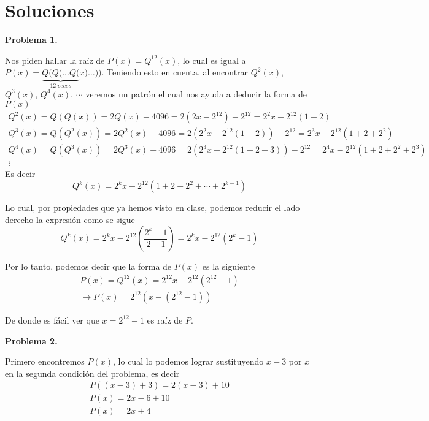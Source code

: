 \newpage
\section*{\large Soluciones}

    \textbf{Problema 1.}

Nos piden hallar la raíz de $P(x) = Q^{12}(x)$, lo cual es igual a $P(x) = \underbrace{Q(Q(...Q(}_{12\ veces}x)\dots))$.
Teniendo esto en cuenta, al encontrar $Q^{2}(x)$, $Q^{3}(x)$, $Q^{4}(x)$, $\cdots$ veremos un patrón el cual nos ayuda a deducir la forma de $P(x)$
\begin{gather*}
    Q^{2}(x) = Q(Q(x)) = 2 Q(x) - 4096 = 2(2x - 2^{12}) - 2^{12} = \boxed{2^2 x - 2^{12} (1 + 2)} \\
    Q^{3}(x) = Q(Q^2(x)) = 2 Q^2(x) - 4096 = 2(2^2 x - 2^{12} (1 + 2)) - 2^{12} = \boxed{2^3 x - 2^{12} (1 + 2 + 2^2)}\\
    Q^{4}(x) = Q(Q^3(x)) = 2 Q^3(x) - 4096 = 2\left(2^3 x - 2^{12} (1 + 2 + 3)\right) - 2^{12} = \boxed{2^4 x - 2^{12} (1 + 2 + 2^2 + 2^3)}\\
    \vdots
\end{gather*}
Es decir
\[\boxed{Q^{k}(x) = 2^k x - 2^{12} (1 + 2 + 2^2 + \cdots + 2^{k-1})}\]

Lo cual, por propiedades que ya hemos visto en clase, podemos reducir el lado derecho la expresión como se sigue
\[Q^{k}(x) = 2^k x - 2^{12} \left(\frac{2^k - 1}{2 - 1}\right) = \boxed{2^k x - 2^{12}(2^k - 1)}\]

Por lo tanto, podemos decir que la forma de $P(x)$ es la siguiente
\begin{gather*}
    P(x) = Q^{12}(x) = 2^{12} x - 2^{12}\left(2^{12} - 1\right)\\
    \longrightarrow P(x) = 2^{12} \left(x - (2^{12} - 1)\right)
\end{gather*}

De donde es fácil ver que $\boxed{x = 2^{12} - 1}$ es raíz de $P$.



\textbf{Problema 2.}

Primero encontremos $P(x)$, lo cual lo podemos lograr sustituyendo $x - 3$ por $x$ en la segunda condición del problema, es decir
\begin{gather*}
    P\left((x - 3) + 3\right) = 2(x - 3) + 10\\
    P(x) = 2x - 6 + 10\\
    P(x) = 2x + 4
\end{gather*}

